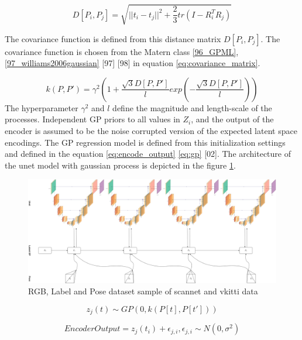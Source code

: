     \begin{equation}
     D[P_i, P_j] = \sqrt{{||t_i - t_j||}^2 + \frac{2}{3} tr(I - R_i^TR_j)}
     \label{eq:distance_matrix}    
    \end{equation}
	
	The covariance function is defined from this distance matrix $D[P_i, P_j]$. The covariance function is chosen from the Matern class \ref{96_GPML}, \ref{97_williams2006gaussian} [97] [98] in equation \ref{eq:covariance_matrix}.  
	
	\begin{equation}
		k(P,P') = \gamma^2(1+\frac{\sqrt{3}D[P,P']}{l}exp(-\frac{\sqrt{3}D[P,P']}{l}))
		\label{eq:covariance_matrix}
	\end{equation}
	The hyperparameter $\gamma^2$ and $l$ define the magnitude and length-scale of the processes. Independent GP priors to all values in $Z_i$, and the output of the encoder is assumed to be the noise corrupted version of the expected latent space encodings. The GP regression model is defined from this initialization settings and defined in the equation \ref{eq:encode_output} \ref{eq:gp} [02]. The architecture of the unet model with gaussian process is depicted in the figure \ref{fig:unet_gp}.

	\begin{figure}[h]
		\centering
		\includegraphics[width=14cm]{images/unet_gp.png}
		\caption{RGB, Label and Pose dataset sample of scannet and vkitti data}
		\label{fig:unet_gp}
	\end{figure}

	\begin{equation}
		z_j(t) \sim GP(0, k(P[t], P[t']))
		\label{eq:gp}
	\end{equation}
	
	\begin{equation}
		EncoderOutput = z_j(t_i)+ \epsilon_{j,i}, \epsilon_{j,i} \sim  N(0, \sigma^2)
		\label{eq:encode_output}
	\end{equation}
    
